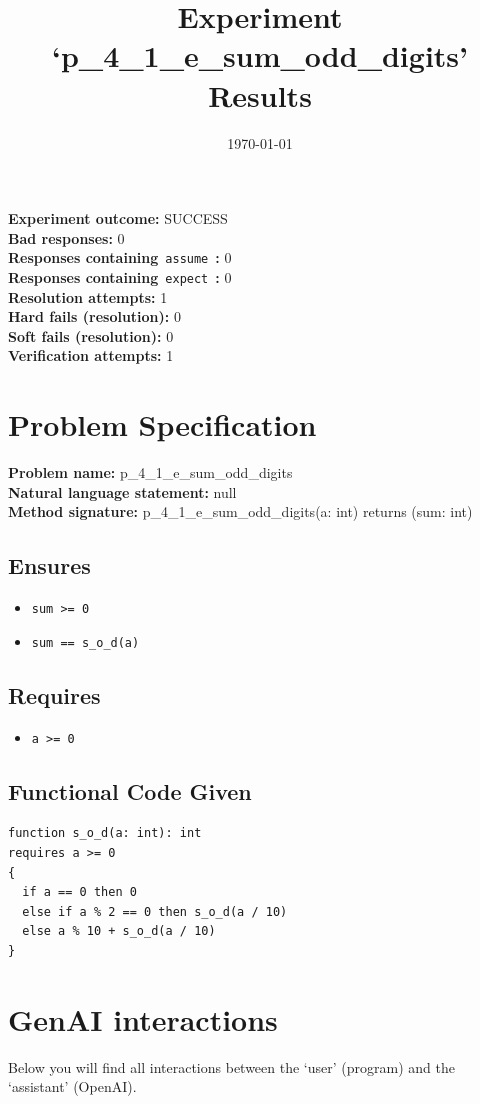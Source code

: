 \documentclass{article}
\begin{document}
\title{Experiment `p\_4\_1\_e\_sum\_odd\_digits' Results}
\author{\today}
\date{}
\maketitle
\textbf{Experiment outcome: }SUCCESS
\\\textbf{Bad responses: }0
\\\textbf{Responses containing}~\texttt{assume}~\textbf{: }0
\\\textbf{Responses containing}~\texttt{expect}~\textbf{: }0
\\\textbf{Resolution attempts: }1
\\\textbf{Hard fails (resolution): }0
\\\textbf{Soft fails (resolution): }0
\\\textbf{Verification attempts: }1
\section*{Problem Specification}
\textbf{Problem name: }p\_4\_1\_e\_sum\_odd\_digits
\\\textbf{Natural language statement: }null
\\\textbf{Method signature: }p\_4\_1\_e\_sum\_odd\_digits(a: int) returns (sum: int)
\subsection*{Ensures}
\begin{itemize}
\item \texttt{sum >= 0}
\item \texttt{sum == s\_o\_d(a)}
\end{itemize}
\subsection*{Requires}
\begin{itemize}
\item \texttt{a >= 0}
\end{itemize}
\subsection*{Functional Code Given}
\begin{lstlisting}
function s_o_d(a: int): int
requires a >= 0
{
  if a == 0 then 0
  else if a % 2 == 0 then s_o_d(a / 10)
  else a % 10 + s_o_d(a / 10)
}
\end{lstlisting}
\clearpage
\section*{GenAI interactions}
Below you will find all interactions between the `user' (program) and the `assistant' (OpenAI).
\end{document}
